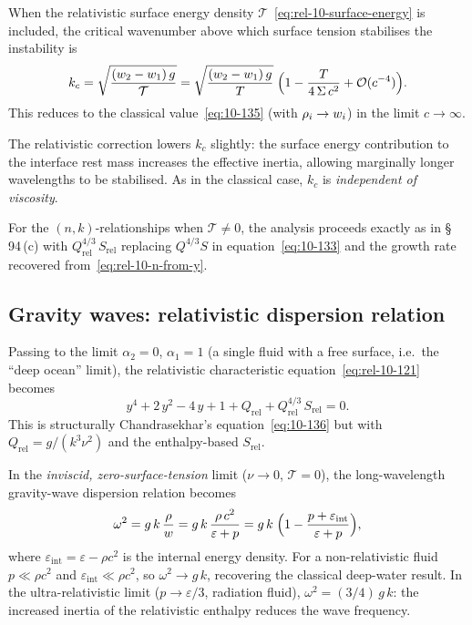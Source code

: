 When the relativistic surface energy density
$\mathcal{T}$~\eqref{eq:rel-10-surface-energy} is included, the
critical wavenumber above which surface tension stabilises the
instability is
\begin{equation}\label{eq:rel-10-kc}
  k_{c}
  = \sqrt{\frac{(w_{2}-w_{1})\,g}{\mathcal{T}}}
  = \sqrt{\frac{(w_{2}-w_{1})\,g}{T}}
    \;\Bigl(1 - \frac{T}{4\,\Sigma\,c^{2}}
    + \mathcal{O}(c^{-4})\Bigr).
\end{equation}
This reduces to the classical value~\eqref{eq:10-135} (with
$\rho_{i} \to w_{i}$) in the limit $c \to \infty$.

The relativistic correction lowers $k_{c}$ slightly: the surface
energy contribution to the interface rest mass increases the effective
inertia, allowing marginally longer wavelengths to be stabilised.  As
in the classical case, $k_{c}$ is \emph{independent of viscosity}.

For the $(n,k)$-relationships when $\mathcal{T} \neq 0$, the
analysis proceeds exactly as in \S\,94\,(c) with
$Q_{\mathrm{rel}}^{4/3}\,S_{\mathrm{rel}}$ replacing
$Q^{4/3}S$ in equation~\eqref{eq:10-133} and the growth rate
recovered from~\eqref{eq:rel-10-n-from-y}.

\subsection{Gravity waves: relativistic dispersion relation}
\label{sec:rel-10-94e}

Passing to the limit $\alpha_{2} = 0$, $\alpha_{1} = 1$ (a single
fluid with a free surface, i.e.\ the ``deep ocean'' limit), the
relativistic characteristic equation~\eqref{eq:rel-10-121} becomes
\begin{equation}\label{eq:rel-10-136}
  y^{4} + 2\,y^{2} - 4\,y + 1
  + Q_{\mathrm{rel}} + Q_{\mathrm{rel}}^{4/3}\,S_{\mathrm{rel}} = 0.
\end{equation}
This is structurally Chandrasekhar's equation~\eqref{eq:10-136} but
with $Q_{\mathrm{rel}} = g/(k^{3}\nu^{2})$ and the enthalpy-based
$S_{\mathrm{rel}}$.

In the \emph{inviscid, zero-surface-tension} limit ($\nu \to 0$,
$\mathcal{T} = 0$), the long-wavelength gravity-wave dispersion
relation becomes
\begin{equation}\label{eq:rel-10-grav-disp}
  \omega^{2} = g\,k\,\frac{\rho}{w}
  = g\,k\,\frac{\rho\,c^{2}}{\varepsilon + p}
  = g\,k\;\Bigl(1 - \frac{p + \varepsilon_{\mathrm{int}}}{\varepsilon+p}\Bigr),
\end{equation}
where $\varepsilon_{\mathrm{int}} = \varepsilon - \rho c^{2}$ is the
internal energy density.  For a non-relativistic fluid
$p \ll \rho c^{2}$ and $\varepsilon_{\mathrm{int}} \ll \rho c^{2}$,
so $\omega^{2} \to g\,k$, recovering the classical deep-water result.
In the ultra-relativistic limit ($p \to \varepsilon/3$, radiation
fluid), $\omega^{2} = (3/4)\,g\,k$: the increased inertia of the
relativistic enthalpy reduces the wave frequency.

